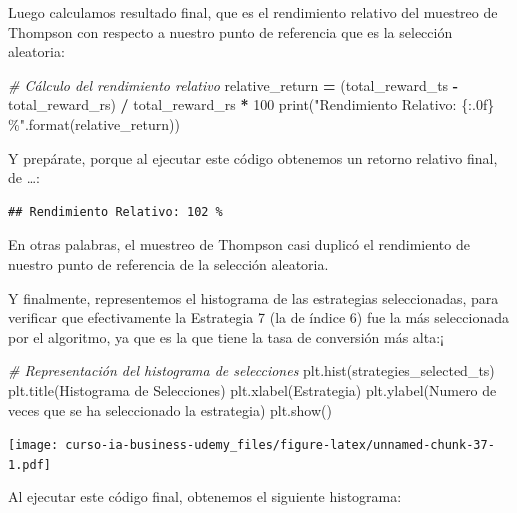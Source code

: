 \documentclass[
]{book}
\newenvironment{Shaded}{\begin{snugshade}}{\end{snugshade}}
\newcommand{\BuiltInTok}[1]{#1}
\newcommand{\CommentTok}[1]{\textcolor[rgb]{0.56,0.35,0.01}{\textit{#1}}}
\newcommand{\DecValTok}[1]{\textcolor[rgb]{0.00,0.00,0.81}{#1}}
\newcommand{\NormalTok}[1]{#1}
\newcommand{\OperatorTok}[1]{\textcolor[rgb]{0.81,0.36,0.00}{\textbf{#1}}}
\newcommand{\SpecialCharTok}[1]{\textcolor[rgb]{0.00,0.00,0.00}{#1}}
\newcommand{\StringTok}[1]{\textcolor[rgb]{0.31,0.60,0.02}{#1}}
\begin{document}
Luego calculamos resultado final, que es el rendimiento relativo del muestreo de Thompson con respecto a nuestro punto de referencia que es la selección aleatoria:

\begin{Shaded}
\begin{Highlighting}[]
\CommentTok{\# Cálculo del rendimiento relativo}
\NormalTok{relative\_return }\OperatorTok{=}\NormalTok{ (total\_reward\_ts }\OperatorTok{{-}}\NormalTok{ total\_reward\_rs) }\OperatorTok{/}\NormalTok{ total\_reward\_rs }\OperatorTok{*} \DecValTok{100}
\BuiltInTok{print}\NormalTok{(}\StringTok{"Rendimiento Relativo: }\SpecialCharTok{\{:.0f\}}\StringTok{ \%"}\NormalTok{.}\BuiltInTok{format}\NormalTok{(relative\_return))}
\end{Highlighting}
\end{Shaded}

Y prepárate, porque al ejecutar este código obtenemos un retorno relativo final, de \ldots:

\begin{verbatim}
## Rendimiento Relativo: 102 %
\end{verbatim}

En otras palabras, el muestreo de Thompson casi duplicó el rendimiento de nuestro punto de referencia de la selección aleatoria.

Y finalmente, representemos el histograma de las estrategias seleccionadas, para verificar que efectivamente la Estrategia 7 (la de índice 6) fue la más seleccionada por el algoritmo, ya que es la que tiene la tasa de conversión más alta:¡

\begin{Shaded}
\begin{Highlighting}[]
\CommentTok{\# Representación del histograma de selecciones}
\NormalTok{plt.hist(strategies\_selected\_ts)}
\NormalTok{plt.title(}\StringTok{\textquotesingle{}Histograma de Selecciones\textquotesingle{}}\NormalTok{)}
\NormalTok{plt.xlabel(}\StringTok{\textquotesingle{}Estrategia\textquotesingle{}}\NormalTok{)}
\NormalTok{plt.ylabel(}\StringTok{\textquotesingle{}Numero de veces que se ha seleccionado la estrategia\textquotesingle{}}\NormalTok{)}
\NormalTok{plt.show()}
\end{Highlighting}
\end{Shaded}

\texttt{[image: curso-ia-business-udemy\_files/figure-latex/unnamed-chunk-37-1.pdf]}

Al ejecutar este código final, obtenemos el siguiente histograma:
\end{document}
